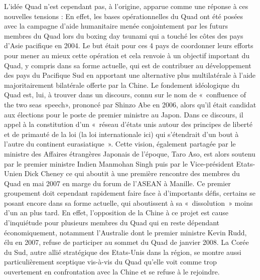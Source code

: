 \documentclass[11pt,a4paper]{article}
\begin{document}
L'idée Quad n'est cependant pas, à l'origine, apparue comme une réponse à ces nouvelles tensions : En effet, les bases opérationnelles du Quad ont été posées avec la campagne d'aide humanitaire menée conjointement par les futurs membres du Quad lors du boxing day tsunami qui a touché les côtes des pays d'Asie pacifique en 2004. Le but était pour ces 4 pays de coordonner leurs efforts pour mener au mieux cette opération et cela renvoie à un objectif important du Quad, y compris dans sa forme actuelle, qui est de contribuer au développement des pays du Pacifique Sud en apportant une alternative plus multilatérale à l'aide majoritairement bilatérale offerte par la Chine. Le fondement idéologique du Quad est, lui, à trouver dans un discours, connu sur le nom de «~confluence of the two seas~speech», prononcé par Shinzo Abe en 2006, alors qu'il était candidat aux élections pour le poste de premier ministre au Japon. Dans ce discours, il appel à la constitution d'un «~réseau d'états unis autour des principes de liberté et de primauté de la loi (la loi internationale ici) qui s'étendrait d'un bout à l'autre du continent eurasiatique~». Cette vision, également partagée par le ministre des Affaires étrangères Japonais de l'époque, Taro Aso, est alors soutenu par le premier ministre Indien Manmohan Singh puis par le Vice-président Etats-Unien Dick Cheney ce qui aboutit à une première rencontre des membres du Quad en mai 2007 en marge du forum de l'ASEAN à Manille. Ce premier groupement doit cependant rapidement faire face à d'importants défis, certains se posant encore dans sa forme actuelle, qui aboutissent à sa «~dissolution~» moins d'un an plus tard. En effet, l'opposition de la Chine à ce projet est cause d'inquiétude pour plusieurs membres du Quad qui en reste dépendant économiquement, notamment l'Australie dont le premier ministre Kevin Rudd, élu en 2007, refuse de participer au sommet du Quad de janvier 2008. La Corée du Sud, autre allié stratégique des Etats-Unis dans la région, se montre aussi particulièrement sceptique vis-à-vis du Quad qu'elle voit comme trop ouvertement en confrontation avec la Chine et se refuse à le rejoindre.
\end{document}
